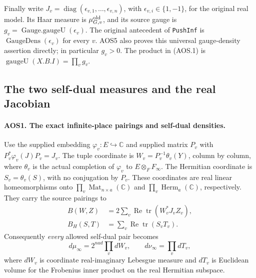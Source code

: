 \documentclass[11pt,a4paper]{article}
\numberwithin{equation}{section}
\theoremstyle{remark}\newtheorem{remark}[theorem]{Remark}
\begin{document}
Finally write $J_v=\operatorname{diag}(\epsilon_{v,1},\ldots,
\epsilon_{v,n})$, with $\epsilon_{v,i}\in\{1,-1\}$, for the original
real model.  Its Haar measure is $\mu_{G,v}^{\rm old}$, and its
source gauge is $g_v=\operatorname{Gauge.gaugeU}(\epsilon_v)$.
The original antecedent of \texttt{Push\allowbreak Inf} is
$\operatorname{GaugeDens}(\epsilon_v)$ for every $v$.
AOS5 also proves this universal gauge-density assertion directly;
in particular $g_v>0$.  The product in (AOS.1) is
$\operatorname{gaugeU}(X.B.I)=\prod_v g_v$.

\subsection{The two self-dual measures and the real Jacobian}

\paragraph{AOS1. The exact infinite-place pairings and self-dual densities.}
\label{claim:AOS1}
Use the supplied embedding $\varphi_v:E\hookrightarrow\mathbb C$
and supplied matrix $P_v$ with
$P_v^*\varphi_v(J)P_v=J_v$.  The tuple coordinate is
$W_v=P_v^{-1}\theta_v(Y)$, column by column, where $\theta_v$ is
the actual completion of $\varphi_v$ to $E\otimes_F F_\infty$.
The Hermitian coordinate is $S_v=\theta_v(S)$, with no conjugation by
$P_v$.  These coordinates are real linear homeomorphisms onto
$\prod_v\operatorname{Mat}_{n\times a}(\mathbb C)$ and
$\prod_v\operatorname{Herm}_a(\mathbb C)$, respectively.  They carry
the source pairings to
\[
 \begin{split}
 B(W,Z)&=2\sum_v\operatorname{Re}\operatorname{tr}(W_v^*J_vZ_v),\\
 B_H(S,T)&=\sum_v\operatorname{Re}\operatorname{tr}(S_vT_v).
 \end{split}
 \tag{AOS.6}
\]
Consequently \emph{every} allowed self-dual pair becomes
\[
             d\mu_\infty=2^{nad}\prod_v dW_v,
       \qquad d\nu_\infty=\prod_v dT_v,
 \tag{AOS.7}
\]
where $dW_v$ is coordinate real-imaginary Lebesgue measure and $dT_v$
is Euclidean volume for the Frobenius inner product on the real
Hermitian subspace.
\end{document}
